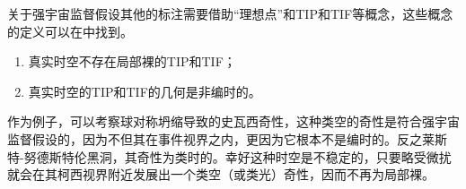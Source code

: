 关于强宇宙监督假设其他的标注需要借助“理想点”和TIP和TIF等概念，这些概念的定义可以在\citep{梁灿彬2006微分几何入门与广义相对论}中找到。
\begin{enumerate}
    \item 真实时空不存在局部裸的TIP和TIF；
    \item 真实时空的TIP和TIF的几何是非编时的。
\end{enumerate}

作为例子，可以考察球对称坍缩导致的史瓦西奇性，这种类空的奇性是符合强宇宙监督假设的，因为不但其在事件视界之内，更因为它根本不是编时的。反之莱斯特-努德斯特伦黑洞，其奇性为类时的。幸好这种时空是不稳定的，只要略受微扰就会在其柯西视界附近发展出一个类空（或类光）奇性，因而不再为局部裸。
